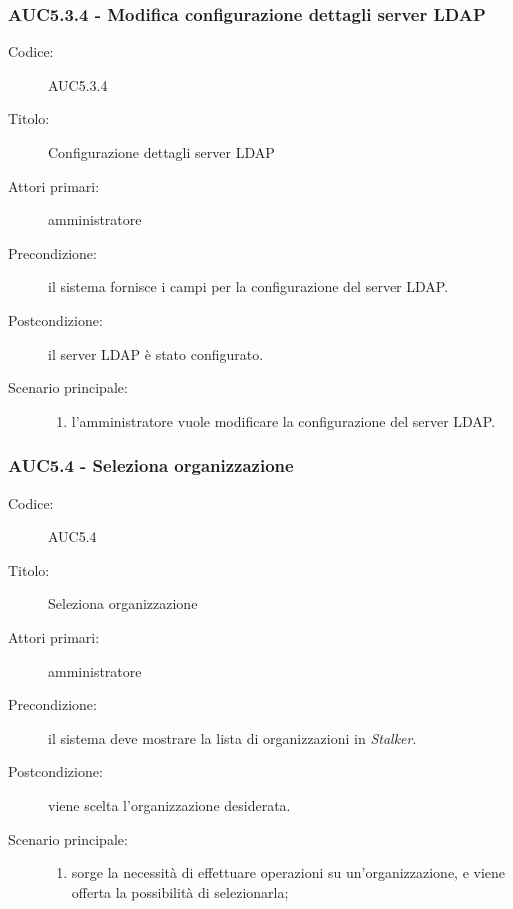 \documentclass[../../../analisi-dei-requisiti.tex]{subfiles}
\begin{document}
\subsubsection{AUC5.3.4 - Modifica configurazione dettagli server LDAP}%
  \label{subs:AUC5.3.4}
  \begin{description}
    \item[Codice:] AUC5.3.4
    \item[Titolo:] Configurazione dettagli server LDAP
    \item[Attori primari:] amministratore
    \item[Precondizione:] il sistema fornisce i campi per la configurazione del server LDAP.
    \item[Postcondizione:] il server LDAP è stato configurato.
    \item[Scenario principale:]
    \begin{enumerate}
      \item l'amministratore vuole modificare la configurazione del server LDAP.
    \end{enumerate}
  \end{description}

\subsubsection{AUC5.4 - Seleziona organizzazione}%
\label{subs:AUC5.4}
\begin{description}
  \item[Codice:] AUC5.4
  \item[Titolo:] Seleziona organizzazione
  \item[Attori primari:] amministratore
  \item[Precondizione:] il sistema deve mostrare la lista di organizzazioni in \emph{Stalker}.
  \item[Postcondizione:] viene scelta l'organizzazione desiderata.
  \item[Scenario principale:]
  \begin{enumerate}
    \item sorge la necessità di effettuare operazioni su un'organizzazione, e viene offerta la possibilità di selezionarla;
  \end{enumerate}
\end{description}
\end{document}

